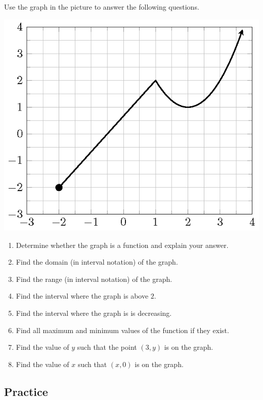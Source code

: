 \begin{example}

Use the graph in the picture to answer the following questions.\\
\begin{fullwidth}
  \includegraphics[width=0.8\linewidth]{figs/function-example-quadratic.png}
\end{fullwidth}

\begin{enumerate}[itemsep=2\baselineskip]
\item
  Determine whether the graph is a function and explain your answer.
\item
  Find the domain (in interval notation) of the graph.
\item
  Find the range (in interval notation) of the graph.
\item
  Find the interval where the graph is above \(2\).

\item
  Find the interval where the graph is is decreasing.

\item
  Find all maximum and minimum values of the function if they exist.
\item
  Find the value of \(y\) such that the point \((3, y)\) is on the
  graph.
\item
  Find the value of \(x\) such that \((x, 0)\) is on the graph.
\end{enumerate}

\end{example}



\subsection{Practice}

